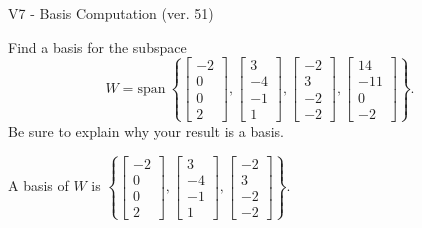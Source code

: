 \begin{exercise}
  \begin{exerciseTitle}V7 - Basis Computation (ver. 51)\end{exerciseTitle}
  \begin{exerciseStatement}
    Find a basis for the subspace 
\[W=\mathrm{span}\ \left\{\left[\begin{array}{r}
-2 \\
0 \\
0 \\
2
\end{array}\right] , \left[\begin{array}{r}
3 \\
-4 \\
-1 \\
1
\end{array}\right] , \left[\begin{array}{r}
-2 \\
3 \\
-2 \\
-2
\end{array}\right] , \left[\begin{array}{r}
14 \\
-11 \\
0 \\
-2
\end{array}\right]\right\}.\]
 Be sure to explain why your result is a basis.


  \end{exerciseStatement}
  \begin{exerciseAnswer}
   A basis of \(W\) is  \(\left\{\left[\begin{array}{r}
-2 \\
0 \\
0 \\
2
\end{array}\right] , \left[\begin{array}{r}
3 \\
-4 \\
-1 \\
1
\end{array}\right] , \left[\begin{array}{r}
-2 \\
3 \\
-2 \\
-2
\end{array}\right]\right\}\).
  


  \end{exerciseAnswer}
\end{exercise}